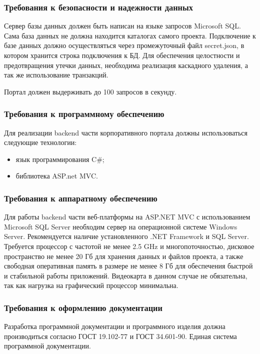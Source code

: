 \subsubsection{Требования к безопасности и надежности данных}
Сервер базы данных должен быть написан на языке запросов Microsoft SQL. Сама база данных не должна находится каталогах самого проекта. Подключение к базе данных должно осуществляться через промежуточный файл secret.json, в котором хранится строка подключения к БД. Для обеспечения целостности и предотвращения утечки данных, необходима реализация каскадного удаления, а так же использование транзакций. 

Портал должен выдерживать до 100 запросов в секунду.

\subsubsection{Требования к программному обеспечению}

Для реализации backend части корпоративного портала должны использоваться
следующие технологии:
\begin{itemize}
	\item язык программирования C\#;
	\item библиотека ASP.net MVC.
\end{itemize}

\subsubsection{Требования к аппаратному обеспечению}

Для работы backend части веб-платформы на ASP.NET MVC с использованием Microsoft SQL Server необходим сервер на операционной системе Windows Server. Рекомендуется наличие установленного .NET Framework и SQL Server. Требуется процессор с частотой не менее 2.5 GHz и многопоточностью, дисковое пространство не менее 20 Гб для хранения данных и файлов проекта, а также свободная оперативная память в размере не менее 8 Гб для обеспечения быстрой и стабильной работы приложений. Видеокарта в данном случае не обязательна, так как нагрузка на графический процессор минимальна.

\subsubsection{Требования к оформлению документации}

Разработка программной документации и программного изделия должна производиться согласно ГОСТ 19.102-77 и ГОСТ 34.601-90. Единая система программной документации.
